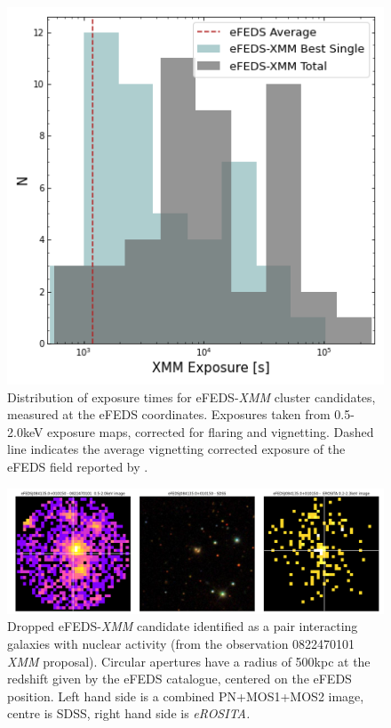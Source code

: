\documentclass[fleqn,usenatbib]{mnras}
\begin{document}
\begin{figure}
    \centering
    \includegraphics[width=0.95\columnwidth]{images/xmm_exposures.png}
    \caption[]{Distribution of exposure times for eFEDS-{\em XMM} cluster candidates, measured at the eFEDS coordinates. Exposures taken from 0.5-2.0keV exposure maps, corrected for flaring and vignetting. Dashed line indicates the average vignetting corrected exposure of the eFEDS field reported by \cite{efedsclustercat}.}
    \label{fig:xmmexposure}
\end{figure}

\begin{figure}
    \centering
    \includegraphics[width=1\textwidth]{images/interactingagn.png}
    \caption[]{Dropped eFEDS-{\em XMM} candidate identified as a pair interacting galaxies with nuclear activity (from the observation 0822470101 {\em XMM} proposal). Circular apertures have a radius of 500kpc at the redshift given by the eFEDS catalogue, centered on the eFEDS position. Left hand side is a combined PN+MOS1+MOS2 image, centre is SDSS, right hand side is {\em eROSITA.}}
    \label{fig:pairagn}
\end{figure}
\end{document}
